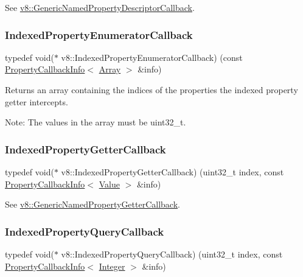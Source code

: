 See {\ttfamily \mbox{\hyperlink{namespacev8_a8cf8faa26baffa84173a24906c0d49f6}{v8\+::\+Generic\+Named\+Property\+Descriptor\+Callback}}}. \mbox{\label{namespacev8_adbb0a6d5537371953f9ba807d4f6275e}} 
\subsubsection{\texorpdfstring{Indexed\+Property\+Enumerator\+Callback}{IndexedPropertyEnumeratorCallback}}
{\footnotesize\ttfamily typedef void($\ast$ v8\+::\+Indexed\+Property\+Enumerator\+Callback) (const \mbox{\hyperlink{classv8_1_1PropertyCallbackInfo}{Property\+Callback\+Info}}$<$ \mbox{\hyperlink{classv8_1_1Array}{Array}} $>$ \&info)}

Returns an array containing the indices of the properties the indexed property getter intercepts.

Note\+: The values in the array must be uint32\+\_\+t. \mbox{\label{namespacev8_a48e7816ba64447bf32a25d194588daaf}} 
\subsubsection{\texorpdfstring{Indexed\+Property\+Getter\+Callback}{IndexedPropertyGetterCallback}}
{\footnotesize\ttfamily typedef void($\ast$ v8\+::\+Indexed\+Property\+Getter\+Callback) (uint32\+\_\+t index, const \mbox{\hyperlink{classv8_1_1PropertyCallbackInfo}{Property\+Callback\+Info}}$<$ \mbox{\hyperlink{classv8_1_1Value}{Value}} $>$ \&info)}

See {\ttfamily \mbox{\hyperlink{namespacev8_a24b1801fa53a7c5a71366d8044927563}{v8\+::\+Generic\+Named\+Property\+Getter\+Callback}}}. \mbox{\label{namespacev8_a980b62c33eb664783e61e25c3b27f9ee}} 
\subsubsection{\texorpdfstring{Indexed\+Property\+Query\+Callback}{IndexedPropertyQueryCallback}}
{\footnotesize\ttfamily typedef void($\ast$ v8\+::\+Indexed\+Property\+Query\+Callback) (uint32\+\_\+t index, const \mbox{\hyperlink{classv8_1_1PropertyCallbackInfo}{Property\+Callback\+Info}}$<$ \mbox{\hyperlink{classv8_1_1Integer}{Integer}} $>$ \&info)}

